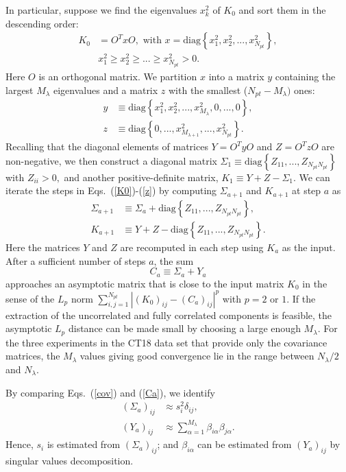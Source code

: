 In particular,
suppose we find the eigenvalues $x_{k}^{2}$ of $K_{0}$ and sort
them in the descending order:
\begin{align}
K_{0} & =O^{T}xO,\mbox{ with }x=\mbox{diag}\left\{ x_{1}^{2},x_{2}^{2},...,x_{N_{pt}}^{2}\right\} ,\label{K0}\\
 & x_{1}^{2}\geq x_{2}^{2}\geq...\geq x_{N_{pt}}^{2}>0.
\end{align}
Here $O$ is an orthogonal matrix.
We partition $x$ into a matrix $y$ containing the largest $M_{\lambda}$
eigenvalues and a matrix $z$ with the smallest ($N_{pt}-M_{\lambda})$
ones:
\begin{align}
y & \equiv\mbox{diag}\left\{ x_{1}^{2},x_{2}^{2},...,x_{M_{\lambda}}^{2},0,...,0\right\} ,\\
z & \equiv\mbox{diag}\left\{ 0,...,x_{M_{\lambda+1}}^{2},...,x_{N_{pt}}^{2}\right\} .\label{z}
\end{align}
Recalling that the diagonal elements of matrices $Y=O^{T}yO$ and
$Z=O^{T}zO$ are non-negative, we then construct a diagonal matrix
$\Sigma_{1}\equiv\mbox{diag}\left\{ Z_{11},...,Z_{N_{pt}N_{pt}}\right\} $
with $Z_{ii}>0,$ and another positive-definite matrix, $K_{1}\equiv Y+Z-\Sigma_{1}.$
We can iterate the steps in Eqs.~(\ref{K0})-(\ref{z}) by computing
$\Sigma_{a+1}$ and $K_{a+1}$ at step $a$ as
\begin{align}
\Sigma_{a+1} & \equiv\Sigma_{a}+\mbox{diag}\left\{ Z_{11},...,Z_{N_{pt}N_{pt}}\right\} ,\\
K_{a+1} & \equiv Y+Z-\mbox{diag}\left\{ Z_{11},...,Z_{N_{pt}N_{pt}}\right\} .
\end{align}
Here the matrices $Y$ and $Z$ are recomputed in each step using $K_{a}$ as the
input. After a sufficient number of steps $a$, the sum
\begin{equation}
C_{a}\equiv\Sigma_{a}+Y_{a}\label{Ca}
\end{equation}
approaches an asymptotic matrix that is close to the input matrix
$K_{0}$ in the sense of the $L_{p}$ norm $\sum_{i,j=1}^{N_{pt}}\left|(K_{0})_{ij}-(C_{a})_{ij}\right|^{p}$
with $p=2$ or $1$. If the extraction of the uncorrelated and fully
correlated components is feasible, the asymptotic $L_{p}$ distance
can be made small by choosing a large enough $M_{\lambda}$. For the
three experiments \cite{Aaij:2015gna,Aaij:2015zlq,Khachatryan:2016pev} in the CT18 data set that provide only the covariance
matrices, the $M_\lambda$ values giving good convergence
lie in the range between $N_{\lambda}/2$ and $N_{\lambda}$. 

By comparing
Eqs.~(\ref{cov}) and (\ref{Ca}), we identify
\begin{align}
(\Sigma_{a})_{ij} & \approx s_{i}^{2}\delta_{ij},\\
(Y_{a})_{ij} & \approx\sum_{\alpha=1}^{M_{\lambda}}\beta_{i\alpha}\beta_{j\alpha}.
\end{align}
Hence, $s_i$ is estimated from $(\Sigma_a)_{ij}$; and $\beta_{i\alpha}$ can be estimated from $(Y_{a})_{ij}$ by singular
values decomposition.


